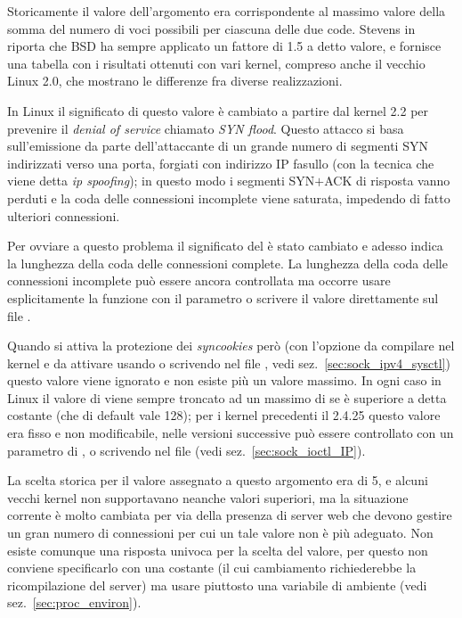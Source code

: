 Storicamente il valore dell'argomento  era corrispondente al
massimo valore della somma del numero di voci possibili per ciascuna delle due
code. Stevens in \cite{UNP1} riporta che BSD ha sempre applicato un fattore di
1.5 a detto valore, e fornisce una tabella con i risultati ottenuti con vari
kernel, compreso anche il vecchio Linux 2.0, che mostrano le differenze fra
diverse realizzazioni.

In Linux il significato di questo valore è cambiato a partire dal kernel 2.2
per prevenire il \textit{denial of service} chiamato 
\textit{SYN flood}. Questo attacco si basa sull'emissione da parte
dell'attaccante di un grande numero di segmenti SYN indirizzati verso una
porta, forgiati con indirizzo IP fasullo (con la tecnica che viene detta
\textit{ip spoofing}); in questo modo i segmenti SYN$+$ACK di risposta vanno
perduti e la coda delle connessioni incomplete viene saturata, impedendo di
fatto ulteriori connessioni.

Per ovviare a questo problema il significato del  è stato
cambiato e adesso indica la lunghezza della coda delle connessioni
complete. La lunghezza della coda delle connessioni incomplete può essere
ancora controllata ma occorre usare esplicitamente la funzione 
con il parametro  o scrivere il valore 
direttamente sul file .

Quando si attiva la protezione dei \textit{syncookies} però (con l'opzione da
compilare nel kernel e da attivare usando  o scrivendo nel file
, vedi sez.~\ref{sec:sock_ipv4_sysctl})
questo valore viene ignorato e non esiste più un valore massimo.  In ogni caso
in Linux il valore di  viene sempre troncato ad un massimo di
 se è superiore a detta costante (che di default vale 128);
per i kernel precedenti il 2.4.25 questo valore era fisso e non modificabile,
nelle versioni successive può essere controllato con un parametro di
, o scrivendo nel file  
(vedi sez.~\ref{sec:sock_ioctl_IP}).

La scelta storica per il valore assegnato a questo argomento era di 5, e
alcuni vecchi kernel non supportavano neanche valori superiori, ma la
situazione corrente è molto cambiata per via della presenza di server web che
devono gestire un gran numero di connessioni per cui un tale valore non è più
adeguato. Non esiste comunque una risposta univoca per la scelta del valore,
per questo non conviene specificarlo con una costante (il cui cambiamento
richiederebbe la ricompilazione del server) ma usare piuttosto una variabile
di ambiente (vedi sez.~\ref{sec:proc_environ}). 

